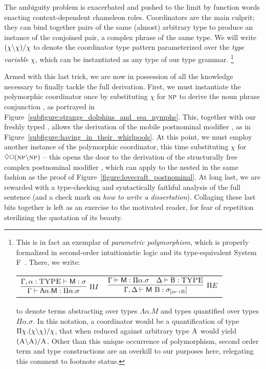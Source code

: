 The ambiguity problem is exacerbated and pushed to the limit by function words enacting context-dependent chameleon roles.
Coordinators are the main culprit; they can bind together pairs of the same (almost) arbitrary type to produce an instance of the conjoined pair, a complex phrase of the same type.
We will write $(\chi\backslash\chi)/\chi$ to denote the coordinator type pattern parameterized over the \textit{type variable} $\chi$, which can be instantiated as any type of our type grammar.%
\footnote{
This is in fact an exemplar of \textit{parametric polymorphism}, which is properly formalized in second-order intuitionistic logic and its type-equivalent System F~\cite{girard1972interpretation, reynolds1974towards}. There, we write:
\begin{center}
\begin{tabularx}{0.6\textwidth}{@{}cc@{}}
$\infer[\Pi I]{\Gamma \vdash \term{\Lambda \alpha.M}: \Pi \alpha.\sigma}{\Gamma, \alpha : \prop{TYPE} \vdash \term{M}: \sigma}$
&
$\infer[\Pi E]{\Gamma, \Delta \vdash \term{M~\prop{B}}: \sigma_{[\alpha\mapsto\smallprop{B}}]}{\Gamma \vdash\term{M}: \Pi \alpha.\sigma &  \Delta \vdash \term{B}: \prop{TYPE}}$
\end{tabularx}
\end{center}
to denote terms abstracting over types $\Lambda \alpha.M$ and types quantified over types $\Pi \alpha.\sigma$.
In this notation, a coordinator would be a quantification of type $\Pi\chi.(\chi\backslash\chi)/\chi$, that when reduced against arbitrary type $\smallprop{A}$ would yield $(\smallprop{A}\divleft\smallprop{A})\divright\smallprop{A}$.
Other than this unique occurrence of polymorphism, second order term and type constructions are an overkill to our purposes here, relegating this comment to footnote status.
}

Armed with this last trick, we are now in possession of all the knowledge necessary to finally tackle the full derivation.
First, we must instantiate the polymorphic coordinator once by substituting $\chi$ for $\np[s]$ to derive the noun phrase conjunction , as portrayed in Figure~\ref{subfigure:strange_dolphins_and_sea_nymphs}.
This, together with our freshly typed , allows the derivation of the mobile postnominal modifier , as in Figure~\ref{subfigure:having_in_their_whirlpools}.
At this point, we must employ another instance of the polymorphic coordinator, this time substituting $\chi$ for $\diamond\Box (\np\divleft\np[s])$ -- this opens the door to the derivation of the structurally free complex postnominal modifier , which can apply to the nested  in the same fashion as the proof of Figure~\ref{figure:lovecraft_postnominal}.
At long last, we are rewarded with a type-checking and syntactically faithful analysis of the full sentence (and a check mark on \textit{how to write a dissertation}).
Collaging these last bits together is left as an exercise to the motivated reader, for fear of repetition sterilizing the quotation of its beauty.

